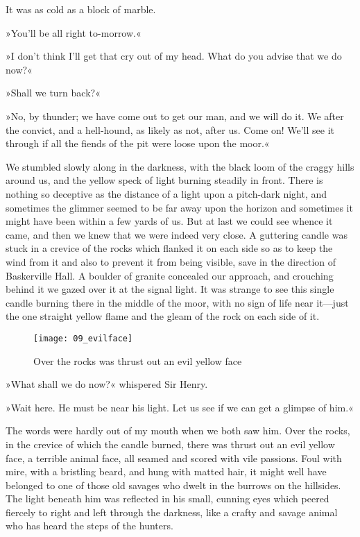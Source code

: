 It was as cold as a block of marble.

»You'll be all right to-morrow.«

»I don't think I'll get that cry out of my head. What do you advise that we do now?«

»Shall we turn back?«

»No, by thunder; we have come out to get our man, and we will do it. We after the convict, and a hell-hound, as likely as not, after us. Come on! We'll see it through if all the fiends of the pit were loose upon the moor.«

We stumbled slowly along in the darkness, with the black loom of the craggy hills around us, and the yellow speck of light burning steadily in front. There is nothing so deceptive as the distance of a light upon a pitch-dark night, and sometimes the glimmer seemed to be far away upon the horizon and sometimes it might have been within a few yards of us. But at last we could see whence it came, and then we knew that we were indeed very close. A guttering candle was stuck in a crevice of the rocks which flanked it on each side so as to keep the wind from it and also to prevent it from being visible, save in the direction of Baskerville Hall. A boulder of granite concealed our approach, and crouching behind it we gazed over it at the signal light. It was strange to see this single candle burning there in the middle of the moor, with no sign of life near it\allowbreak---\allowbreak just the one straight yellow flame and the gleam of the rock on each side of it.

\begin{figure}[h!]
\centering
\texttt{[image: 09\_evilface]}
\caption{Over the rocks was thrust out an evil yellow face}
\end{figure}

»What shall we do now?« whispered Sir Henry.

»Wait here. He must be near his light. Let us see if we can get a glimpse of him.«

The words were hardly out of my mouth when we both saw him. Over the rocks, in the crevice of which the candle burned, there was thrust out an evil yellow face, a terrible animal face, all seamed and scored with vile passions. Foul with mire, with a bristling beard, and hung with matted hair, it might well have belonged to one of those old savages who dwelt in the burrows on the hillsides. The light beneath him was reflected in his small, cunning eyes which peered fiercely to right and left through the darkness, like a crafty and savage animal who has heard the steps of the hunters.

